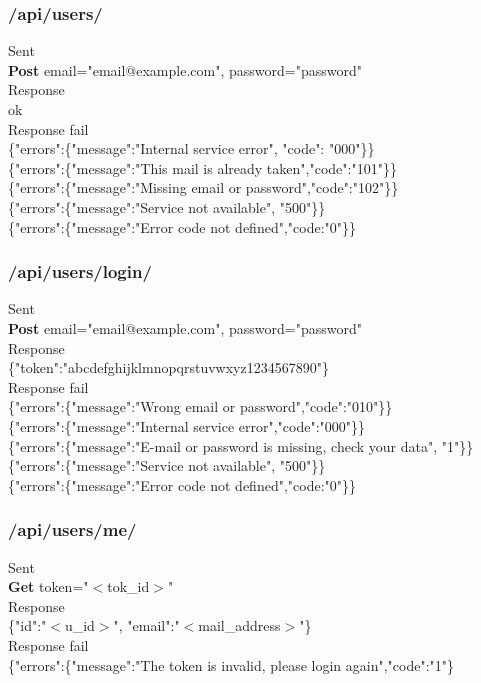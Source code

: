 
\subsubsection{/api/users/}        
\tab   	Sent\\
\tab\tab	\textbf{Post} email="email@example.com", password="password"\\
\tab   	Response\\
\tab{} ok\\
\tab   	Response fail\\
\tab\tab   	\{"errors":\{"message":"Internal service error", "code": "000"\}\}\\
\tab\tab   	\{"errors":\{"message":"This mail is already taken","code":"101"\}\}\\
\tab\tab   	\{"errors":\{"message":"Missing email or password","code":"102"\}\}\\
\tab\tab	\{"errors":\{"message":"Service not available", "500"\}\}\\
\tab\tab	\{"errors":\{"message":"Error code not defined","code:"0"\}\}\\

\subsubsection{/api/users/login/}
\tab    Sent\\
\tab\tab	\textbf{Post} email="email@example.com", password="password"\\
\tab	Response\\
\tab\tab	\{"token":"abcdefghijklmnopqrstuvwxyz1234567890"\}\\
\tab	Response fail\\
\tab\tab	\{"errors":\{"message":"Wrong email or password","code":"010"\}\}\\
\tab\tab	\{"errors":\{"message":"Internal service error","code":"000"\}\}\\
\tab\tab	\{"errors":\{"message":"E-mail or password is missing, check your data", "1"\}\}\\
\tab\tab	\{"errors":\{"message":"Service not available", "500"\}\}\\
\tab\tab	\{"errors":\{"message":"Error code not defined","code:"0"\}\}\\

\subsubsection{/api/users/me/}
\tab	Sent\\
\tab\tab	\textbf{Get} token="$<$tok\_id$>$"\\
\tab	Response\\
\tab\tab	\{"id":"$<$u\_id$>$", "email":"$<$mail\_address$>$"\}\\
\tab	Response fail\\
\tab\tab	\{"errors":\{"message":"The token is invalid, please login again","code":"1"\}\\